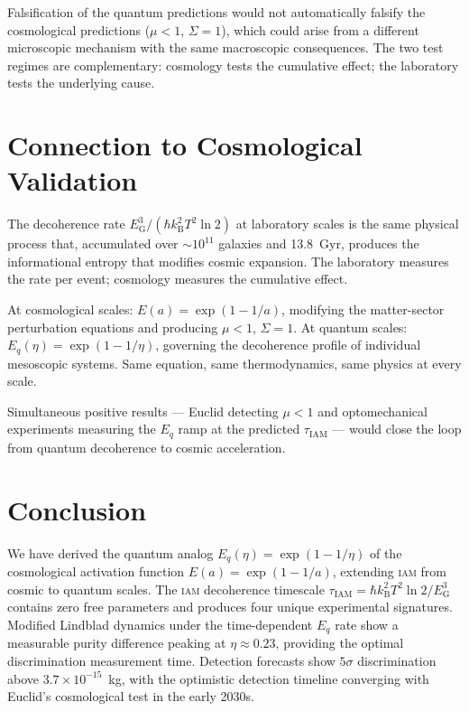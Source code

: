 \documentclass[12pt,letterpaper]{article}
\newcommand{\IAM}{\textsc{iam}}
\newcommand{\kB}{k_{\mathrm{B}}}
\newcommand{\EG}{E_{\mathrm{G}}}
\newcommand{\tauIAM}{\tau_{\mathrm{IAM}}}
\newcommand{\Ea}{E(a)}
\begin{document}
\noindent Falsification of the quantum predictions would not automatically
falsify the cosmological predictions ($\mu < 1$, $\Sigma = 1$), which could
arise from a different microscopic mechanism with the same macroscopic
consequences. The two test regimes are complementary: cosmology tests the
cumulative effect; the laboratory tests the underlying cause.

\section{Connection to Cosmological Validation}

The decoherence rate $\EG^3/(\hbar \kB^2 T^2 \ln 2)$ at laboratory scales
is the same physical process that, accumulated over $\sim 10^{11}$ galaxies
and 13.8~Gyr, produces the informational entropy that modifies cosmic
expansion. The laboratory measures the rate per event; cosmology measures
the cumulative effect.

At cosmological scales: $\Ea = \exp(1 - 1/a)$, modifying the
matter-sector perturbation equations and producing $\mu < 1$, $\Sigma = 1$.
At quantum scales: $E_q(\eta) = \exp(1 - 1/\eta)$, governing the
decoherence profile of individual mesoscopic systems. Same equation, same
thermodynamics, same physics at every scale.

Simultaneous positive results --- Euclid detecting $\mu < 1$ and
optomechanical experiments measuring the $E_q$ ramp at the predicted
$\tauIAM$ --- would close the loop from quantum decoherence to cosmic
acceleration.

\section{Conclusion}

We have derived the quantum analog $E_q(\eta) = \exp(1 - 1/\eta)$ of the
cosmological activation function $\Ea = \exp(1 - 1/a)$, extending \IAM{}
from cosmic to quantum scales. The \IAM{} decoherence timescale
$\tauIAM = \hbar \kB^2 T^2 \ln 2 / \EG^3$ contains zero free parameters
and produces four unique experimental signatures. Modified Lindblad
dynamics under the time-dependent $E_q$ rate show a measurable purity
difference peaking at $\eta \approx 0.23$, providing the optimal
discrimination measurement time. Detection forecasts show $5\sigma$
discrimination above $3.7 \times 10^{-15}$~kg, with the optimistic
detection timeline converging with Euclid's cosmological test in the
early 2030s.
\end{document}
